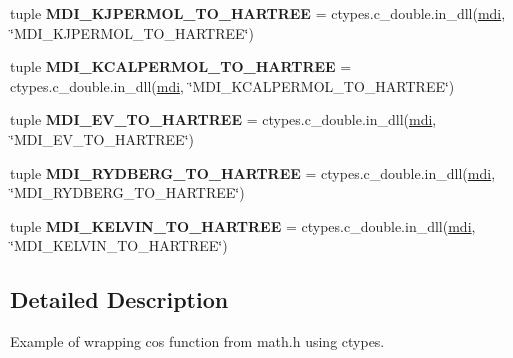 \begin{DoxyCompactItemize}
\item 
\hypertarget{namespacemolssi__driver__interface_1_1mdi__python_a1f2827afb48ba04e8cdf01e0338be59a}{tuple {\bfseries M\-D\-I\-\_\-\-K\-J\-P\-E\-R\-M\-O\-L\-\_\-\-T\-O\-\_\-\-H\-A\-R\-T\-R\-E\-E} = ctypes.\-c\-\_\-double.\-in\-\_\-dll(\hyperlink{classmdi}{mdi}, \char`\"{}M\-D\-I\-\_\-\-K\-J\-P\-E\-R\-M\-O\-L\-\_\-\-T\-O\-\_\-\-H\-A\-R\-T\-R\-E\-E\char`\"{})}\label{namespacemolssi__driver__interface_1_1mdi__python_a1f2827afb48ba04e8cdf01e0338be59a}

\item 
\hypertarget{namespacemolssi__driver__interface_1_1mdi__python_a5ce99ff44b63eb656af3d7b6d1beb360}{tuple {\bfseries M\-D\-I\-\_\-\-K\-C\-A\-L\-P\-E\-R\-M\-O\-L\-\_\-\-T\-O\-\_\-\-H\-A\-R\-T\-R\-E\-E} = ctypes.\-c\-\_\-double.\-in\-\_\-dll(\hyperlink{classmdi}{mdi}, \char`\"{}M\-D\-I\-\_\-\-K\-C\-A\-L\-P\-E\-R\-M\-O\-L\-\_\-\-T\-O\-\_\-\-H\-A\-R\-T\-R\-E\-E\char`\"{})}\label{namespacemolssi__driver__interface_1_1mdi__python_a5ce99ff44b63eb656af3d7b6d1beb360}

\item 
\hypertarget{namespacemolssi__driver__interface_1_1mdi__python_a3abea311a5949119d44ecf8f4a919820}{tuple {\bfseries M\-D\-I\-\_\-\-E\-V\-\_\-\-T\-O\-\_\-\-H\-A\-R\-T\-R\-E\-E} = ctypes.\-c\-\_\-double.\-in\-\_\-dll(\hyperlink{classmdi}{mdi}, \char`\"{}M\-D\-I\-\_\-\-E\-V\-\_\-\-T\-O\-\_\-\-H\-A\-R\-T\-R\-E\-E\char`\"{})}\label{namespacemolssi__driver__interface_1_1mdi__python_a3abea311a5949119d44ecf8f4a919820}

\item 
\hypertarget{namespacemolssi__driver__interface_1_1mdi__python_af4cf34c20f7a2a2460b5279f5c6f929f}{tuple {\bfseries M\-D\-I\-\_\-\-R\-Y\-D\-B\-E\-R\-G\-\_\-\-T\-O\-\_\-\-H\-A\-R\-T\-R\-E\-E} = ctypes.\-c\-\_\-double.\-in\-\_\-dll(\hyperlink{classmdi}{mdi}, \char`\"{}M\-D\-I\-\_\-\-R\-Y\-D\-B\-E\-R\-G\-\_\-\-T\-O\-\_\-\-H\-A\-R\-T\-R\-E\-E\char`\"{})}\label{namespacemolssi__driver__interface_1_1mdi__python_af4cf34c20f7a2a2460b5279f5c6f929f}

\item 
\hypertarget{namespacemolssi__driver__interface_1_1mdi__python_a1aaf3dab1ed5e0f9fa6c892db7c6199e}{tuple {\bfseries M\-D\-I\-\_\-\-K\-E\-L\-V\-I\-N\-\_\-\-T\-O\-\_\-\-H\-A\-R\-T\-R\-E\-E} = ctypes.\-c\-\_\-double.\-in\-\_\-dll(\hyperlink{classmdi}{mdi}, \char`\"{}M\-D\-I\-\_\-\-K\-E\-L\-V\-I\-N\-\_\-\-T\-O\-\_\-\-H\-A\-R\-T\-R\-E\-E\char`\"{})}\label{namespacemolssi__driver__interface_1_1mdi__python_a1aaf3dab1ed5e0f9fa6c892db7c6199e}

\end{DoxyCompactItemize}


\subsection{Detailed Description}
\begin{DoxyVerb}Example of wrapping cos function from math.h using ctypes. \end{DoxyVerb}
 